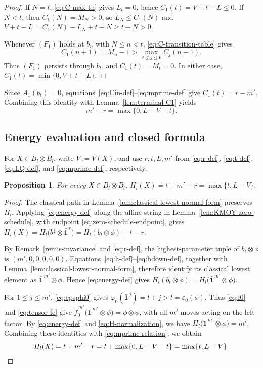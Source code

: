 \documentclass[11pt,reqno]{amsart}
\numberwithin{table}{section}
\numberwithin{equation}{section}
\theoremstyle{plain}
\newtheorem{proposition}[theorem]{Proposition}
\theoremstyle{definition}
\begin{document}
\begin{proof}
	If \(N=t\), \eqref{eq:C-max-tn} gives \(L_t=0\), hence $C_1(t)=V+t-L\le0$.
	If \(N<t\), then \(C_1(N)=M_N>0\), so \(L_N\le C_1(N)\) and $V+t-L
	=
	C_1(N)-L_N+t-N
	\ge t-N>0$.

	Whenever \((F_1)\) holds at \(b_n\) with \(N\le n<t\),
	\eqref{eq:C-transition-table} gives
	\[
	C_1(n+1)=M_n-1>
	\max_{2\le j\le6}C_j(n+1).
	\]
	Thus \((F_1)\) persists through \(b_t\), and
	\(C_1(t)=M_t=0\).
	In either case,
	\(C_1(t)=\min\{0,V+t-L\}\).
\end{proof}

Since \(A_1(b_t)=0\), equations~\eqref{eq:Cin-def}--\eqref{eq:mprime-def} give \(C_1(t)=r-m'\).
Combining this identity with Lemma~\ref{lem:terminal-C1} yields
\begin{equation}\label{eq:mprime-relation}
	m'-r=\max\{0,L-V-t\}.
\end{equation}

\subsection{Energy evaluation and closed formula}

For \(X\in B_l\otimes B_l\), write \(V:=V(X)\), and use
\(r,t,L,m'\) from \eqref{eq:r-def}, \eqref{eq:t-def},
\eqref{eq:LQ-def}, and \eqref{eq:mprime-def}, respectively.

\begin{proposition}
	\label{prop:canonical-energy}
	For every \(X\in B_l\otimes B_l\), $H_l(X)=t+m'-r=\max\{t,L-V\}$.
\end{proposition}

\begin{proof}
The classical path in Lemma~\ref{lem:classical-lowest-normal-form}
preserves \(H_l\).
Applying \eqref{eq:energy-def} along the affine string in
Lemma~\ref{lem:KMOY-zero-schedule}, with endpoint
\eqref{eq:zero-schedule-endpoint}, gives $H_l(X)
=
H_l\bigl(b^\downarrow\otimes\bar{\mathbf1}^{\,r}\bigr)
=
H_l(b_t\otimes\phi)+t-r$.

	
	By Remark~\ref{rem:s-invariance} and \eqref{eq:r-def},
	the highest-parameter tuple of \(b_t\otimes\phi\) is
	\((m',0,0,0,0,0)\).
	Equations~\eqref{eq:h-def}--\eqref{eq:bdown-def},
	together with Lemma~\ref{lem:classical-lowest-normal-form},
	therefore identify its classical lowest element as
	\(\bar{\mathbf1}^{\,m'}\otimes\phi\).
	Hence \eqref{eq:energy-def} gives $H_l(b_t\otimes\phi)
	=
	H_l\bigl(\bar{\mathbf1}^{\,m'}\otimes\phi\bigr)$.
	
	For \(1\le j\le m'\), \eqref{eq:epsphi0} gives $\varphi_0(\bar{\mathbf1}^{\,j})
	=
	l+j
	>
	l
	=
	\varepsilon_0(\phi)$.
	Thus \eqref{eq:f0} and \eqref{eq:tensor-fe} give $\widetilde f_0^{\,m'}
	\bigl(\bar{\mathbf1}^{\,m'}\otimes\phi\bigr)
	=
	\phi\otimes\phi$,
	with all \(m'\) moves acting on the left factor.
	By \eqref{eq:energy-def} and \eqref{eq:H-normalization}, we have $H_l\bigl(\bar{\mathbf1}^{\,m'}\otimes\phi\bigr)=m'$.
	Combining these identities with \eqref{eq:mprime-relation},
	we obtain
	\[
	H_l(X)
	=
	t+m'-r
	=
	t+\max\{0,L-V-t\}
	=
	\max\{t,L-V\}.\qedhere
	\]
\end{proof}
\end{document}
